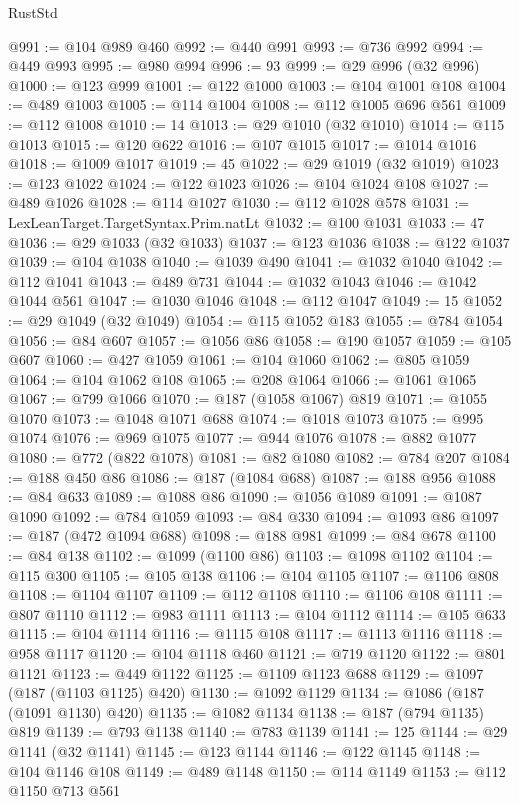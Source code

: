 \begin{lexlean}{RustStd}
\begin{coremodule}
@991 := @104 @989 @460
@992 := @440 @991
@993 := @736 @992
@994 := @449 @993
@995 := @980 @994
@996 := 93
@999 := @29 @996 (@32 @996)
@1000 := @123 @999
@1001 := @122 @1000
@1003 := @104 @1001 @108
@1004 := @489 @1003
@1005 := @114 @1004
@1008 := @112 @1005 @696 @561
@1009 := @112 @1008
@1010 := 14
@1013 := @29 @1010 (@32 @1010)
@1014 := @115 @1013
@1015 := @120 @622
@1016 := @107 @1015
@1017 := @1014 @1016
@1018 := @1009 @1017
@1019 := 45
@1022 := @29 @1019 (@32 @1019)
@1023 := @123 @1022
@1024 := @122 @1023
@1026 := @104 @1024 @108
@1027 := @489 @1026
@1028 := @114 @1027
@1030 := @112 @1028 @578
@1031 := LexLeanTarget.TargetSyntax.Prim.natLt
@1032 := @100 @1031
@1033 := 47
@1036 := @29 @1033 (@32 @1033)
@1037 := @123 @1036
@1038 := @122 @1037
@1039 := @104 @1038
@1040 := @1039 @490
@1041 := @1032 @1040
@1042 := @112 @1041
@1043 := @489 @731
@1044 := @1032 @1043
@1046 := @1042 @1044 @561
@1047 := @1030 @1046
@1048 := @112 @1047
@1049 := 15
@1052 := @29 @1049 (@32 @1049)
@1054 := @115 @1052 @183
@1055 := @784 @1054
@1056 := @84 @607
@1057 := @1056 @86
@1058 := @190 @1057
@1059 := @105 @607
@1060 := @427 @1059
@1061 := @104 @1060
@1062 := @805 @1059
@1064 := @104 @1062 @108
@1065 := @208 @1064
@1066 := @1061 @1065
@1067 := @799 @1066
@1070 := @187 (@1058 @1067) @819
@1071 := @1055 @1070
@1073 := @1048 @1071 @688
@1074 := @1018 @1073
@1075 := @995 @1074
@1076 := @969 @1075
@1077 := @944 @1076
@1078 := @882 @1077
@1080 := @772 (@822 @1078)
@1081 := @82 @1080
@1082 := @784 @207
@1084 := @188 @450 @86
@1086 := @187 (@1084 @688)
@1087 := @188 @956
@1088 := @84 @633
@1089 := @1088 @86
@1090 := @1056 @1089
@1091 := @1087 @1090
@1092 := @784 @1059
@1093 := @84 @330
@1094 := @1093 @86
@1097 := @187 (@472 @1094 @688)
@1098 := @188 @981
@1099 := @84 @678
@1100 := @84 @138
@1102 := @1099 (@1100 @86)
@1103 := @1098 @1102
@1104 := @115 @300
@1105 := @105 @138
@1106 := @104 @1105
@1107 := @1106 @808
@1108 := @1104 @1107
@1109 := @112 @1108
@1110 := @1106 @108
@1111 := @807 @1110
@1112 := @983 @1111
@1113 := @104 @1112
@1114 := @105 @633
@1115 := @104 @1114
@1116 := @1115 @108
@1117 := @1113 @1116
@1118 := @958 @1117
@1120 := @104 @1118 @460
@1121 := @719 @1120
@1122 := @801 @1121
@1123 := @449 @1122
@1125 := @1109 @1123 @688
@1129 := @1097 (@187 (@1103 @1125) @420)
@1130 := @1092 @1129
@1134 := @1086 (@187 (@1091 @1130) @420)
@1135 := @1082 @1134
@1138 := @187 (@794 @1135) @819
@1139 := @793 @1138
@1140 := @783 @1139
@1141 := 125
@1144 := @29 @1141 (@32 @1141)
@1145 := @123 @1144
@1146 := @122 @1145
@1148 := @104 @1146 @108
@1149 := @489 @1148
@1150 := @114 @1149
@1153 := @112 @1150 @713 @561

\end{coremodule}
\end{lexlean}
